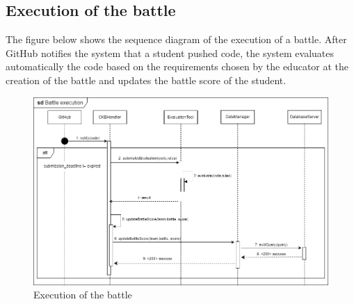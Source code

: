 \subsection{Execution of the battle}
The figure below shows the sequence diagram of the execution of a battle. After GitHub notifies the system that a student pushed code, the system
evaluates automatically the code based on the requirements chosen by the educator at the creation of the battle and
updates the battle score of the student.\\
\begin{figure}[H]
    \centering
    \includegraphics[width=1\textwidth]{images/seq_diagrams/battle_execution_DD.png}
    \caption{Execution of the battle}
\end{figure}
\clearpage

